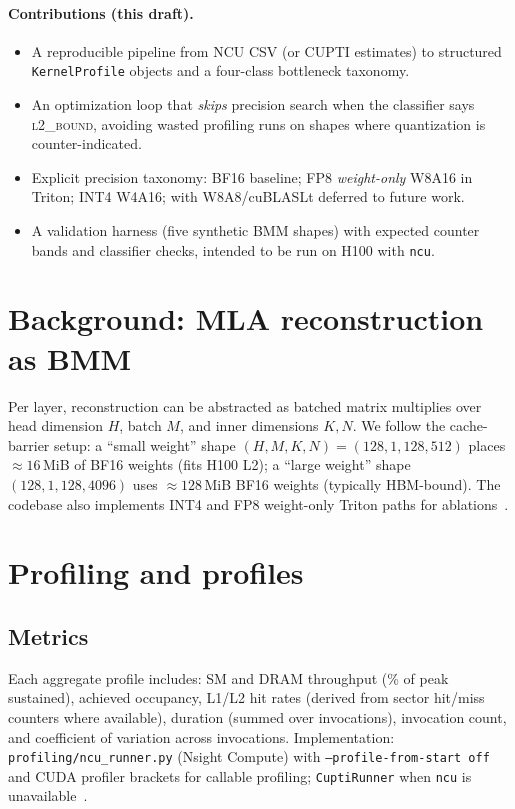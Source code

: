 \documentclass[11pt]{article}
\begin{document}
\paragraph{Contributions (this draft).}
\begin{itemize}\itemsep0pt
  \item A reproducible pipeline from NCU CSV (or CUPTI estimates) to structured \texttt{KernelProfile} objects and a four-class bottleneck taxonomy.
  \item An optimization loop that \emph{skips} precision search when the classifier says \textsc{l2\_bound}, avoiding wasted profiling runs on shapes where quantization is counter-indicated.
  \item Explicit precision taxonomy: BF16 baseline; FP8 \emph{weight-only} W8A16 in Triton; INT4 W4A16; with W8A8/cuBLASLt deferred to future work.
  \item A validation harness (five synthetic BMM shapes) with expected counter bands and classifier checks, intended to be run on H100 with \texttt{ncu}.
\end{itemize}

\section{Background: MLA reconstruction as BMM}
Per layer, reconstruction can be abstracted as batched matrix multiplies over head dimension $H$, batch $M$, and inner dimensions $K,N$.
We follow the cache-barrier setup: a ``small weight'' shape $(H,M,K,N)=(128,1,128,512)$ places $\approx 16$\,MiB of BF16 weights (fits H100 L2); a ``large weight'' shape $(128,1,128,4096)$ uses $\approx 128$\,MiB BF16 weights (typically HBM-bound).
The codebase also implements INT4 and FP8 weight-only Triton paths for ablations~\citep{kernelcompass2026}.

\section{Profiling and profiles}
\subsection{Metrics}
Each aggregate profile includes: SM and DRAM throughput (\% of peak sustained), achieved occupancy, L1/L2 hit rates (derived from sector hit/miss counters where available), duration (summed over invocations), invocation count, and coefficient of variation across invocations.
Implementation: \texttt{profiling/ncu\_runner.py} (Nsight Compute) with \texttt{--profile-from-start off} and CUDA profiler brackets for callable profiling; \texttt{CuptiRunner} when \texttt{ncu} is unavailable~\citep{nvidia_ncu}.
\end{document}
